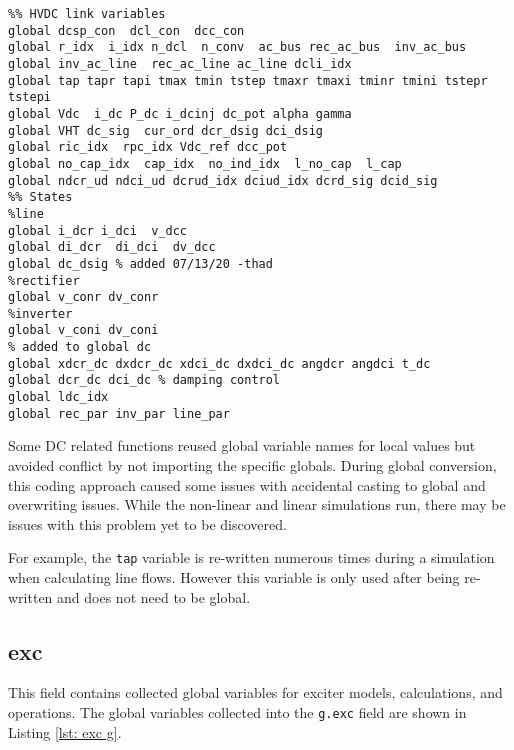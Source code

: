 \begin{lstlisting}[caption={DC Global Field Variables},label={lst: dc g}]
\end{lstlisting}\vspace{-2 em}
\begin{verbatim}
%% HVDC link variables 
global dcsp_con  dcl_con  dcc_con
global r_idx  i_idx n_dcl  n_conv  ac_bus rec_ac_bus  inv_ac_bus
global inv_ac_line  rec_ac_line ac_line dcli_idx
global tap tapr tapi tmax tmin tstep tmaxr tmaxi tminr tmini tstepr tstepi
global Vdc  i_dc P_dc i_dcinj dc_pot alpha gamma 
global VHT dc_sig  cur_ord dcr_dsig dci_dsig
global ric_idx  rpc_idx Vdc_ref dcc_pot
global no_cap_idx  cap_idx  no_ind_idx  l_no_cap  l_cap
global ndcr_ud ndci_ud dcrud_idx dciud_idx dcrd_sig dcid_sig
%% States
%line
global i_dcr i_dci  v_dcc
global di_dcr  di_dci  dv_dcc
global dc_dsig % added 07/13/20 -thad
%rectifier
global v_conr dv_conr
%inverter
global v_coni dv_coni
% added to global dc
global xdcr_dc dxdcr_dc xdci_dc dxdci_dc angdcr angdci t_dc
global dcr_dc dci_dc % damping control
global ldc_idx
global rec_par inv_par line_par
\end{verbatim}

Some DC related functions reused global variable names for local values but avoided conflict by not importing the specific globals.
During global conversion, this coding approach caused some issues with accidental casting to global and overwriting issues.
While the non-linear and linear simulations run, there may be issues with this problem yet to be discovered.

For example, the \verb|tap| variable is re-written numerous times during a simulation when calculating line flows.
However this variable is only used after being re-written and does not need to be global.


\pagebreak
\subsection{exc}
This field contains collected global variables for exciter models, calculations, and operations.
The global variables collected into the \verb|g.exc| field are shown in Listing \ref{lst: exc g}.

